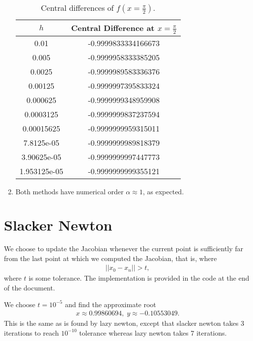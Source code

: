 \documentclass[10pt]{article}
\begin{document}
\begin{enumerate}
    \begin{table}[h!]
      \centering
      \begin{tabular}{c c} 
       \(h\) & Central Difference at \(x = \frac{\pi}{2}\) \\
       \hline
       0.01 & -0.9999833334166673 \\
       0.005 & -0.9999958333385205 \\
       0.0025 & -0.9999989583336376 \\
       0.00125 & -0.9999997395833324 \\
       0.000625 & -0.9999999348959908 \\
       0.0003125 & -0.9999999837237594 \\
       0.00015625 & -0.9999999959315011 \\
       7.8125e-05 & -0.9999999989818379 \\
       3.90625e-05 & -0.9999999997447773 \\
       1.953125e-05 & -0.9999999999355121 \\
      \end{tabular}
      \caption{Central differences of \(f(x = \frac{\pi}{2})\).}
      \label{tab:cd}
      \end{table}
  
      \item Both methods have numerical order \(\alpha  \approx 1\), as expected.
  
\end{enumerate}

\section{Slacker Newton}
We choose to update the Jacobian whenever the current point is sufficiently far from the last point at which we computed the Jacobian, that is, where \begin{align*}
  ||x_0 - x_n|| > t,
\end{align*} where \(t\) is some tolerance. The implementation is provided in the code at the end of the document.

We choose \(t = 10^{-5}\) and find the approximate root \begin{align*}
    x \approx 0.99860694, \; y \approx -0.10553049.
\end{align*} This is the same as is found by lazy newton, except that slacker newton takes 3 iterations to reach \(10^{-10}\) tolerance whereas lazy newton takes 7 iterations.
\end{document}
